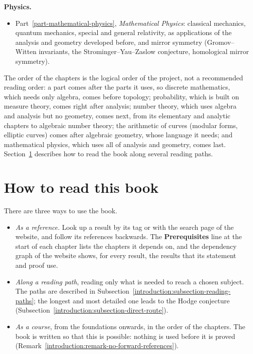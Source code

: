 \noindent\textbf{Physics.}
\begin{itemize}
\item Part~\ref{part-mathematical-physics}, \emph{Mathematical Physics}:
classical mechanics, quantum mechanics, special and general relativity, as
applications of the analysis and geometry developed before, and mirror symmetry
(Gromov--Witten invariants, the Strominger--Yau--Zaslow conjecture, homological
mirror symmetry).
\end{itemize}
The order of the chapters is the logical order of the project, not a
recommended reading order: a part comes after the parts it uses, so discrete
mathematics, which needs only algebra, comes before topology; probability,
which is built on measure theory, comes right after analysis; number theory,
which uses algebra and analysis but no geometry, comes next, from its
elementary and analytic chapters to algebraic number theory; the arithmetic of
curves (modular forms, elliptic curves) comes after algebraic geometry, whose
language it needs; and mathematical physics, which uses all of analysis and
geometry, comes last.
Section~\ref{introduction:section-path} describes how to read the book along
several reading paths.

\section{How to read this book}\label{introduction:section-path}

There are three ways to use the book.
\begin{itemize}
\item \emph{As a reference.} Look up a result by its tag or with the search page of the website, and follow its references backwards. The \textbf{Prerequisites} line at the start of
each chapter lists the chapters it depends on, and the dependency graph of the website shows, for every result, the results that its statement and proof use.
\item \emph{Along a reading path}, reading only what is needed to reach a chosen subject. The paths are described in
Subsection~\ref{introduction:subsection-reading-paths}; the longest and most detailed one leads to the Hodge conjecture
(Subsection~\ref{introduction:subsection-direct-route}).
\item \emph{As a course}, from the foundations onwards, in the order of the chapters. The book is written so that this is possible: nothing is used before it is proved
(Remark~\ref{introduction:remark-no-forward-references}).
\end{itemize}

